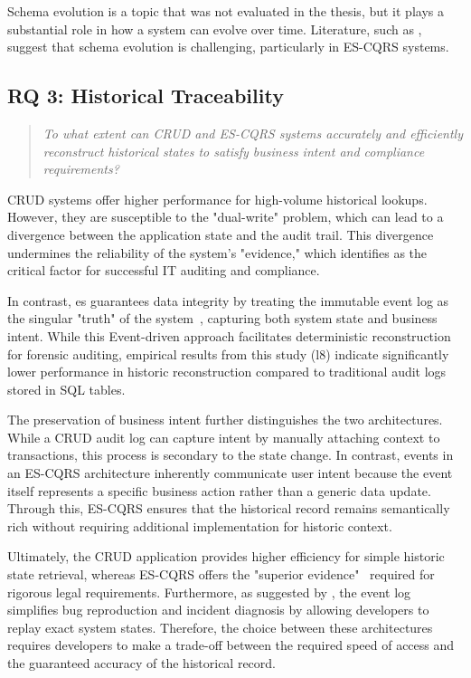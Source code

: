 Schema evolution is a topic that was not evaluated in the thesis, but it plays a substantial role in how a system can evolve over time. Literature, such as \cite{overeem_empirical_2021}, suggest that schema evolution is challenging, particularly in ES-CQRS systems.

\subsection{RQ 3: Historical Traceability}
\label{sec:answering-rq-3}

\begin{quote}
    \textit{To what extent can CRUD and ES-CQRS systems accurately and efficiently reconstruct historical states to satisfy business intent and compliance requirements?}
\end{quote}

CRUD systems offer higher performance for high-volume historical lookups. However, they are susceptible to the "dual-write" problem, which can lead to a divergence between the application state and the audit trail. This divergence undermines the reliability of the system's "evidence," which \textcite[155]{gantz_basics_2014} identifies as the critical factor for successful IT auditing and compliance.

In contrast, \acrlong{es} guarantees data integrity by treating the immutable event log as the singular "truth" of the system~\cite{helland_immutability_2015}, capturing both system state and business intent. While this Event-driven approach facilitates deterministic reconstruction for forensic auditing, empirical results from this study (\gls{l}8) indicate significantly lower performance in historic reconstruction compared to traditional audit logs stored in SQL tables.

The preservation of business intent further distinguishes the two architectures. While a CRUD audit log can capture intent by manually attaching context to transactions, this process is secondary to the state change. In contrast, events in an ES-CQRS architecture inherently communicate user intent because the event itself represents a specific business action rather than a generic data update. Through this, ES-CQRS ensures that the historical record remains semantically rich without requiring additional implementation for historic context.

Ultimately, the CRUD application provides higher efficiency for simple historic state retrieval, whereas ES-CQRS offers the "superior evidence"~\cite[17]{maier_audit_2006} required for rigorous legal requirements. Furthermore, as suggested by \cites[531]{kleppmann_designing_2017}{monagari_demystifying_2026}, the event log simplifies bug reproduction and incident diagnosis by allowing developers to replay exact system states. Therefore, the choice between these architectures requires developers to make a trade-off between the required speed of access and the guaranteed accuracy of the historical record.

